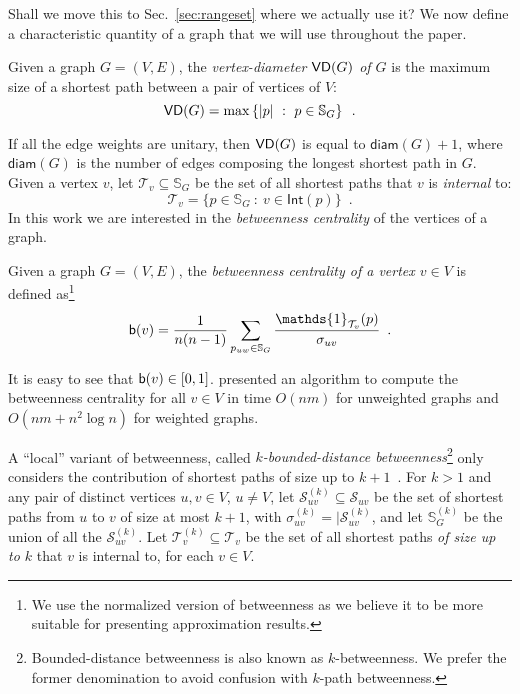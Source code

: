 \XXX Shall we move this to Sec.~\ref{sec:rangeset} where we actually use it?
We now define a characteristic quantity of a graph that we will use throughout
the paper.
\begin{definition}\label{def:vertexdiam}
  Given a graph $G=(V,E)$, the \emph{vertex-diameter $\mathsf{VD}(G)$ of $G$} is the
  maximum size of a shortest path between a pair of vertices of $V$:
  \[
  \mathsf{VD}(G) = \max\left\{|p| ~:~ p\in \mathbb{S}_G\right\}\enspace.\]
\end{definition}
If all the edge weights are unitary, then $\mathsf{VD}(G)$ is equal to
$\mathsf{diam}(G)+1$, where $\mathsf{diam}(G)$ is the number of edges composing the
longest shortest path in $G$.
Given a vertex $v$, let $\mathcal{T}_v\subseteq\mathbb{S}_G$ be the set of all
shortest paths that $v$ is \emph{internal} to:
\[
\mathcal{T}_v=\{p\in\mathbb{S}_G ~:~ v\in\mathsf{Int}(p)\}\enspace.
\]
In this work we are interested in the \emph{betweenness centrality} of the
vertices of a graph.
\begin{definition}\label{def:betwenness}
  Given a graph $G=(V,E)$, the \emph{betweenness centrality of a vertex $v\in
  V$} is defined as\footnote{We use the normalized
version of betweenness as we believe it to be more suitable for presenting approximation
results.}
  \[
  \betw(v)=\frac{1}{n(n-1)}\sum_{p_{uw}\in\mathbb{S}_G}\frac{\mathds{1}_{\mathcal{T}_v}(p)}{\sigma_{uv}}%
  \enspace.
  \]
\end{definition} 

It is easy to see that $\mathsf{b}(v)\in[0,1]$. \citet{Brandes01} presented an
algorithm to compute the betweenness centrality for all $v\in V$ in time
$O(nm)$ for unweighted graphs and $O(nm + n^2 \log n)$ for weighted graphs. 

A ``local'' variant of betweenness, called \emph{$k$-bounded-distance
betweenness}\footnote{Bounded-distance betweenness is also known as
$k$-betweenness. We prefer the former denomination to avoid confusion with
$k$-path betweenness.} only considers
the contribution of shortest paths of size up to $k+1$~\citep{BorgattiE06,Brandes08}.
For $k>1$ and any pair of distinct vertices $u,v\in V$, $u\neq V$, let
$\mathcal{S}^{(k)}_{uv}\subseteq\mathcal{S}_{uv}$ be the set of shortest paths
from $u$ to $v$ of size at most $k+1$, with
$\sigma^{(k)}_{uv}=|\mathcal{S}^{(k)}_{uv}$, and let $\mathbb{S}^{(k)}_G$ be the
union of all the $\mathcal{S}^{(k)}_{uv}$. Let
$\mathcal{T}^{(k)}_v\subseteq\mathcal{T}_v$ be the set of all shortest paths
\emph{of size up to $k$} that $v$ is internal to, for each $v\in V$.

